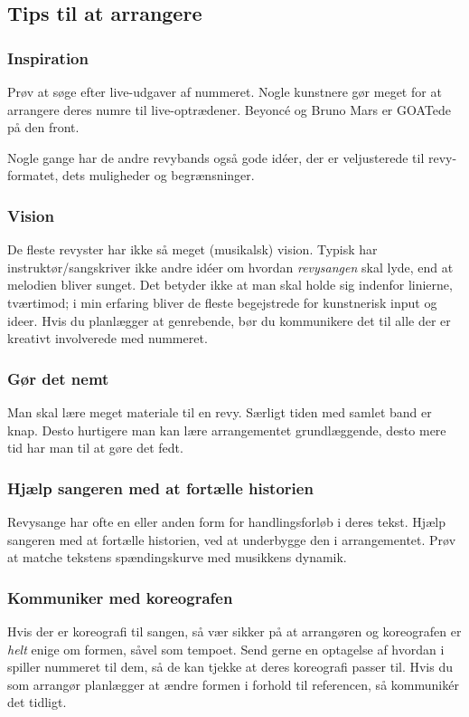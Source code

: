 \subsection{Tips til at arrangere}
\subsubsection{Inspiration}
Prøv at søge efter live-udgaver af nummeret. Nogle kunstnere gør meget for at arrangere deres numre til live-optrædener. Beyoncé og Bruno Mars er GOATede på den front.

Nogle gange har de andre revybands også gode idéer, der er veljusterede til revy-formatet, dets muligheder og begrænsninger.

\subsubsection{Vision}
De fleste revyster har ikke så meget (musikalsk) vision. Typisk har instruktør/sangskriver ikke andre idéer om hvordan \textit{revysangen} skal lyde, end at melodien bliver sunget. Det betyder ikke at man skal holde sig indenfor linierne, tværtimod; i min erfaring bliver de fleste begejstrede for kunstnerisk input og ideer. Hvis du planlægger at genrebende, bør du kommunikere det til alle der er kreativt involverede med nummeret.

\subsubsection{Gør det nemt}
Man skal lære meget materiale til en revy. Særligt tiden med samlet band er knap. Desto hurtigere man kan lære arrangementet grundlæggende, desto mere tid har man til at gøre det fedt.

\subsubsection{Hjælp sangeren med at fortælle historien}
Revysange har ofte en eller anden form for handlingsforløb i deres tekst. Hjælp sangeren med at fortælle historien, ved at underbygge den i arrangementet. Prøv at matche tekstens spændingskurve med musikkens dynamik.

\subsubsection{Kommuniker med koreografen}
Hvis der er koreografi til sangen, så vær sikker på at arrangøren og koreografen er \textit{helt} enige om formen, såvel som tempoet. Send gerne en optagelse af hvordan i spiller nummeret til dem, så de kan tjekke at deres koreografi passer til. Hvis du som arrangør planlægger at ændre formen i forhold til referencen, så kommunikér det tidligt.

